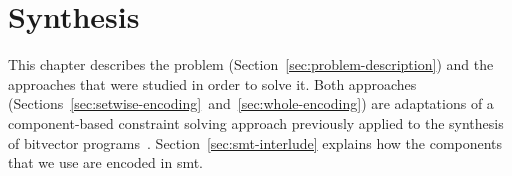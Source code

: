 \chapter{Synthesis}
\label{chap:synthesis}

This chapter describes the problem (Section~\ref{sec:problem-description}) and
the approaches that were studied in order to solve it.
Both approaches
(Sections~\ref{sec:setwise-encoding}~and~\ref{sec:whole-encoding}) are
adaptations of a component-based constraint solving approach previously applied
to the synthesis of bitvector programs~\cite{Gulwani:2011:SLP, Jha:oracle:2010}.
Section~\ref{sec:smt-interlude} explains how the components that we use are
encoded in \gls{smt}.






